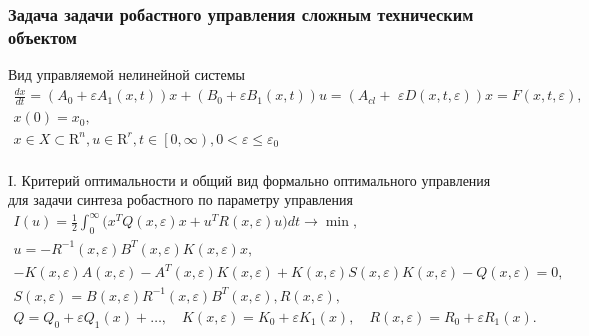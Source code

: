 \documentclass[default]{beamer}
\begin{document}
	\begin{frame}
		\frametitle{Задача задачи робастного управления сложным техническим объектом}
		Вид управляемой нелинейной системы
		\begingroup
		\fontsize{9pt}{9pt}\selectfont
			\[\begin{matrix}
			\frac{dx}{dt}=\left( {{A}_{0}}+\varepsilon {{A}_{1}}(x,t) \right)x+\left( {{B}_{0}}+\varepsilon {{B}_{1}}(x,t) \right)u=({{A}_{cl}}+\,\,\varepsilon D(x,t,\varepsilon ))x=F(x,t,\varepsilon ),\\ x(0)={{x}_{0}}, \\ 
			x\in X\subset {{\text{R}}^{n}},u\in {{\text{R}}^{r}},t\in \left[ 0,\infty  \right),0<\varepsilon \le {{\varepsilon }_{0}} \\ 
			\end{matrix}\]
		\endgroup
		\par\bigskip
		I. Критерий оптимальности и общий вид формально оптимального управления для задачи синтеза робастного по параметру управления
		\begingroup
		\fontsize{9pt}{9pt}\selectfont
			\[\begin{matrix}
			I(u)=\frac{1}{2}\int_{0}^{\infty }{({{x}^{T}}Q(x,\varepsilon )x}+{{u}^{T}}R(x,\varepsilon )u)dt\to \min , \\ 
			u=-{{R}^{-1}}(x,\varepsilon ){{B}^{T}}(x,\varepsilon )K(x,\varepsilon )x,\quad  \\ 
			-K(x,\varepsilon )A(x,\varepsilon )-{{A}^{T}}(x,\varepsilon )K(x,\varepsilon )+K(x,\varepsilon )S(x,\varepsilon )K(x,\varepsilon )-Q(x,\varepsilon )=0, \\ 
			S(x,\varepsilon )=B(x,\varepsilon ){{R}^{-1}}(x,\varepsilon ){{B}^{T}}(x,\varepsilon ),R(x,\varepsilon ), \\ 
			Q={{Q}_{0}}+\varepsilon {{Q}_{1}}(x)+\ldots ,\quad K(x,\varepsilon )={{K}_{0}}+\varepsilon {{K}_{1}}(x),\quad R(x,\varepsilon )={{R}_{0}}+\varepsilon {{R}_{1}}(x). \\ 
			\end{matrix}\]
		\endgroup
	\end{frame}
	
\end{document}

